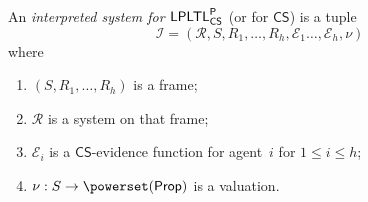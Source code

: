 \documentclass[envcountsect,envcountsame,oribibl,orivec]{llncs}
\newcommand{\Prop}{\textsf{Prop}}
\newcommand{\LPLTLp}{\textsf{LPLTL}^{\sf P}}
\newcommand{\CS}{\textsf{CS}}
\newcommand{\numberofagents}{h}
\newcommand{\agent}{i}
\newcommand{\runs}{\mathcal{R}}
\newcommand{\system}{\mathcal{I}}
\newcommand{\evidence}{\mathcal{E}}
\newcommand{\valuation}{\nu}
\begin{document}
\begin{definition}\label{def:interpreted sysytems LPLTLp}
	An  \emph{interpreted system for $\LPLTLp_\CS$} (or for $\CS$) is a tuple 
	\[
	\system = (\runs, S, R_1,\ldots,R_\numberofagents, \evidence_1\ldots,\evidence_\numberofagents, \valuation)
	\] 
	where
	\begin{enumerate}
		\item $(S, R_1,\ldots,R_\numberofagents)$ is a frame;
		\item $\runs$ is a system on that frame;
		\item $\evidence_\agent$ is a $\CS$-evidence function for agent~$\agent$ for $1 \leq \agent \leq \numberofagents$;
		\item $\valuation: S \to \powerset(\Prop)$ is a valuation.
	\end{enumerate}
\end{definition}
%
\end{document}
